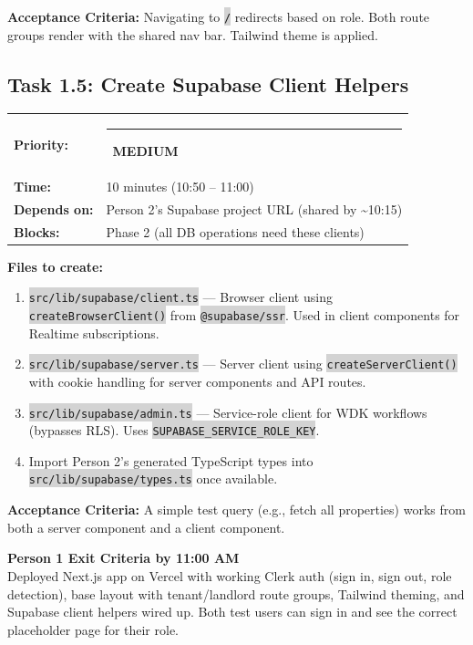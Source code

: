 \documentclass[11pt, a4paper]{article}
\newcommand{\medpri}{\textcolor{medgreen}{\rule{6pt}{6pt}}~\textcolor{medgreen}{\scriptsize\textbf{MEDIUM}}}
\newcommand{\code}[1]{\texttt{\small\colorbox{lightgray}{#1}}}
\begin{document}
\textbf{Acceptance Criteria:} Navigating to \code{/} redirects based on role. Both route groups render with the shared nav bar. Tailwind theme is applied.

\vspace{1em}

\subsection{Task 1.5: Create Supabase Client Helpers}

\begin{tabularx}{\textwidth}{lX}
\textbf{Priority:} & \medpri \\
\textbf{Time:} & 10 minutes (10:50 -- 11:00) \\
\textbf{Depends on:} & Person 2's Supabase project URL (shared by \textasciitilde10:15) \\
\textbf{Blocks:} & Phase 2 (all DB operations need these clients) \\
\end{tabularx}

\vspace{0.3em}

\textbf{Files to create:}
\begin{enumerate}[leftmargin=2em, itemsep=2pt]
  \item \code{src/lib/supabase/client.ts} --- Browser client using \code{createBrowserClient()} from \code{@supabase/ssr}. Used in client components for Realtime subscriptions.
  \item \code{src/lib/supabase/server.ts} --- Server client using \code{createServerClient()} with cookie handling for server components and API routes.
  \item \code{src/lib/supabase/admin.ts} --- Service-role client for WDK workflows (bypasses RLS). Uses \code{SUPABASE\_SERVICE\_ROLE\_KEY}.
  \item Import Person 2's generated TypeScript types into \code{src/lib/supabase/types.ts} once available.
\end{enumerate}

\textbf{Acceptance Criteria:} A simple test query (e.g., fetch all properties) works from both a server component and a client component.

\vspace{0.5em}

\begin{milestonebox}
\textbf{Person 1 Exit Criteria by 11:00 AM}\\[4pt]
Deployed Next.js app on Vercel with working Clerk auth (sign in, sign out, role detection), base layout with tenant/landlord route groups, Tailwind theming, and Supabase client helpers wired up. Both test users can sign in and see the correct placeholder page for their role.
\end{milestonebox}
\end{document}
